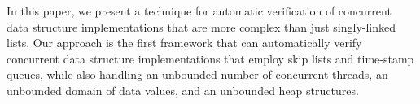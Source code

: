 In this paper, we present a technique for automatic verification of
concurrent data structure implementations that are more complex than
just singly-linked lists.
Our approach is the first framework that can automatically
verify concurrent data structure implementations that employ skip lists and
time-stamp queues, while also handling
an unbounded number of concurrent threads, an
unbounded domain of data values, and an unbounded heap structures.





